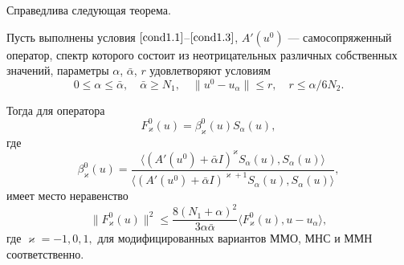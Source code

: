 Справедлива следующая теорема.
\begin{theorem}\label{teomodalpnomonot}
	Пусть выполнены условия $\eqref{cond1.1}$--$\eqref{cond1.3}$,
$A'(u^0)$ --- самосопряженный оператор, спектр которого состоит из неотрицательных различных собственных значений, параметры $\alpha$, $\bar{\alpha}$, $r$ удовлетворяют условиям
	\begin{equation}\label{cond2.4}
	0\le\alpha\le\bar{\alpha}, \quad \bar{\alpha}\ge N_1,\quad \|u^0-u_\alpha\|\le r, \quad r\le\alpha/6N_2.
	\end{equation}
	
	Тогда для оператора
	$$F_\varkappa^0(u)=\beta_{\varkappa}^0(u)S_\alpha(u),$$ где 
	$$\beta_{\varkappa}^0(u)=\frac{\langle (A'(u^0)+\bar\alpha I)^{\varkappa}S_\alpha(u), S_\alpha(u)\rangle}{\langle (A'(u^0)+\bar\alpha I)^{\varkappa+1}S_\alpha(u), S_\alpha(u)\rangle},$$ имеет место неравенство
	$$\|F_\varkappa^0(u)\|^2\le\frac{8(N_1+\alpha)^2}{3\alpha\bar{\alpha}}\langle F_\varkappa^0(u), u-u_\alpha\rangle,$$
	где $\varkappa=-1, 0, 1,$ для модифицированных вариантов ММО, МНС и ММН соответственно.
\end{theorem} 
